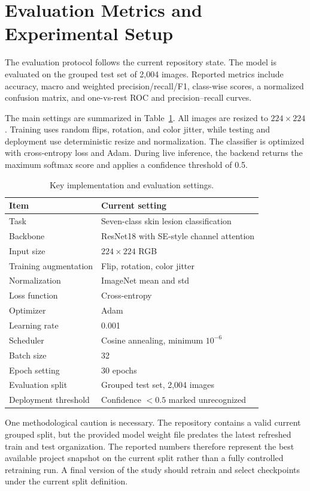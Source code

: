 \section{Evaluation Metrics and Experimental Setup}

The evaluation protocol follows the current repository state. The model is evaluated on the grouped test set of 2{,}004 images. Reported metrics include accuracy, macro and weighted precision/recall/F1, class-wise scores, a normalized confusion matrix, and one-vs-rest ROC and precision--recall curves.

The main settings are summarized in Table~\ref{tab:setup}. All images are resized to \(224\times224\). Training uses random flips, rotation, and color jitter, while testing and deployment use deterministic resize and normalization. The classifier is optimized with cross-entropy loss and Adam. During live inference, the backend returns the maximum softmax score and applies a confidence threshold of 0.5.

\begin{table}[H]
    \centering
    \caption{Key implementation and evaluation settings.}
    \label{tab:setup}
    \begin{tabular}{ll}
        \toprule
        Item & Current setting \\
        \midrule
        Task & Seven-class skin lesion classification \\
        Backbone & ResNet18 with SE-style channel attention \\
        Input size & \(224\times224\) RGB \\
        Training augmentation & Flip, rotation, color jitter \\
        Normalization & ImageNet mean and std \\
        Loss function & Cross-entropy \\
        Optimizer & Adam \\
        Learning rate & 0.001 \\
        Scheduler & Cosine annealing, minimum \(10^{-6}\) \\
        Batch size & 32 \\
        Epoch setting & 30 epochs \\
        Evaluation split & Grouped test set, 2{,}004 images \\
        Deployment threshold & Confidence \(<0.5\) marked unrecognized \\
        \bottomrule
    \end{tabular}
\end{table}

One methodological caution is necessary. The repository contains a valid current grouped split, but the provided model weight file predates the latest refreshed train and test organization. The reported numbers therefore represent the best available project snapshot on the current split rather than a fully controlled retraining run. A final version of the study should retrain and select checkpoints under the current split definition.
